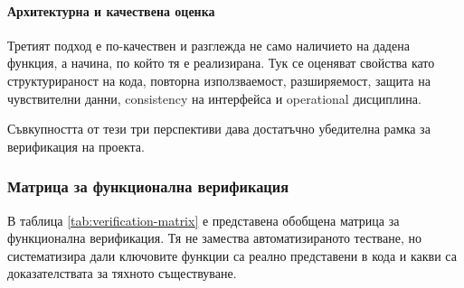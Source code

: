 \paragraph{Архитектурна и качествена оценка}

Третият подход е по-качествен и разглежда не само наличието на дадена функция, а начина, по който тя е реализирана. Тук се оценяват свойства като структурираност на кода, повторна използваемост, разширяемост, защита на чувствителни данни, consistency на интерфейса и operational дисциплина.

Съвкупността от тези три перспективи дава достатъчно убедителна рамка за верификация на проекта.

\subsubsection{Матрица за функционална верификация}

В таблица \ref{tab:verification-matrix} е представена обобщена матрица за функционална верификация. Тя не замества автоматизираното тестване, но систематизира дали ключовите функции са реално представени в кода и какви са доказателствата за тяхното съществуване.

